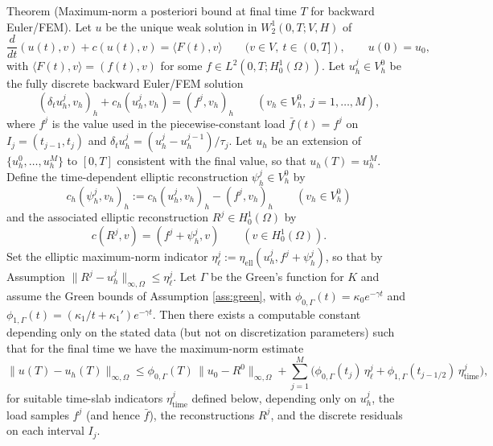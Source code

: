 \documentclass[11pt]{article}
\begin{document}
Theorem (Maximum-norm a posteriori bound at final time $T$ for backward Euler/FEM). Let $u$ be the unique weak solution in $W^1_2(0,T;V,H)$ of
\[
\frac{d}{dt}(u(t),v)+c(u(t),v)=\langle F(t),v\rangle\qquad (v\in V,\ t\in(0,T]),\qquad u(0)=u_0,
\]
with $\langle F(t),v\rangle=(f(t),v)$ for some $f\in L^2(0,T;H^1_0(\Omega))$. Let $u_h^j\in V_h^0$ be the fully discrete backward Euler/FEM solution
\[
(\delta_t u_h^j,v_h)_h+c_h(u_h^j,v_h)=(f^j,v_h)_h\qquad (v_h\in V_h^0,\ j=1,\dots,M),
\]
where $f^j$ is the value used in the piecewise-constant load $\bar f(t)=f^j$ on $I_j=(t_{j-1},t_j)$ and $\delta_t u_h^j=(u_h^j-u_h^{j-1})/\tau_j$. Let $u_h$ be an extension of $\{u_h^0,\dots,u_h^M\}$ to $[0,T]$ consistent with the final value, so that $u_h(T)=u_h^M$. Define the time-dependent elliptic reconstruction $\psi_h^j\in V_h^0$ by
\[
 c_h(\psi_h^j,v_h)_h:=c_h(u_h^j,v_h)_h-(f^j,v_h)_h\qquad (v_h\in V_h^0)
\]
and the associated elliptic reconstruction $R^j\in H^1_0(\Omega)$ by
\[
 c(R^j,v)=(f^j+\psi_h^j,v)\qquad (v\in H^1_0(\Omega)).
\]
Set the elliptic maximum-norm indicator $\eta_\ell^j:=\eta_\mathrm{ell}(u_h^j,f^j+\psi_h^j)$, so that by Assumption $\|R^j-u_h^j\|_{\infty,\Omega}\le \eta_\ell^j$. Let $\Gamma$ be the Green's function for $K$ and assume the Green bounds of Assumption \ref{ass:green}, with $\phi_{0,\Gamma}(t)=\kappa_0 e^{-\gamma t}$ and $\phi_{1,\Gamma}(t)=(\kappa_1/t+\kappa_1')e^{-\gamma t}$. Then there exists a computable constant depending only on the stated data (but not on discretization parameters) such that for the final time we have the maximum-norm estimate
\[
\|u(T)-u_h(T)\|_{\infty,\Omega}
\le
\phi_{0,\Gamma}(T)\,\|u_0-R^0\|_{\infty,\Omega}
+\sum_{j=1}^M \Big(\phi_{0,\Gamma}(t_j)\,\eta_\ell^j+\phi_{1,\Gamma}(t_{j-1/2})\,\eta_\mathrm{time}^j\Big),
\]
for suitable time-slab indicators $\eta_\mathrm{time}^j$ defined below, depending only on $u_h^j$, the load samples $f^j$ (and hence $\bar f$), the reconstructions $R^j$, and the discrete residuals on each interval $I_j$.

\medskip
\end{document}
